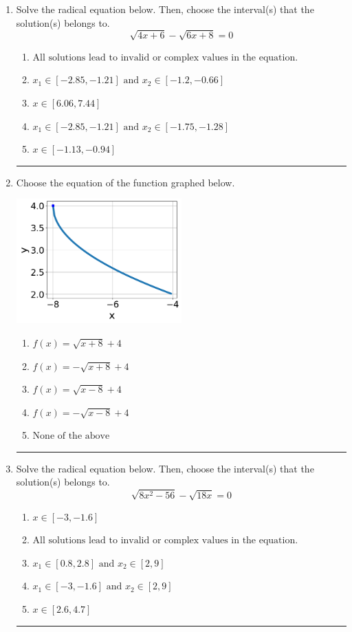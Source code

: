 \documentclass[14pt]{extbook}
\newcommand{\litem}[1]{\item#1\hspace*{-1cm}\rule{\textwidth}{0.4pt}}
\begin{document}
\begin{enumerate}
{\begin{enumerate}[label=\Alph*.]
\end{enumerate} }
\litem{
Solve the radical equation below. Then, choose the interval(s) that the solution(s) belongs to.\[ \sqrt{4 x + 6} - \sqrt{6 x + 8} = 0 \]\begin{enumerate}[label=\Alph*.]
\item \( \text{All solutions lead to invalid or complex values in the equation.} \)
\item \( x_1 \in [-2.85, -1.21] \text{ and } x_2 \in [-1.2,-0.66] \)
\item \( x \in [6.06,7.44] \)
\item \( x_1 \in [-2.85, -1.21] \text{ and } x_2 \in [-1.75,-1.28] \)
\item \( x \in [-1.13,-0.94] \)

\end{enumerate} }
\litem{
Choose the equation of the function graphed below.
\begin{center}
    \includegraphics[width=0.5\textwidth]{../Figures/radicalGraphToEquationCopyC.png}
\end{center}
\begin{enumerate}[label=\Alph*.]
\item \( f(x) = \sqrt{x + 8} + 4 \)
\item \( f(x) = - \sqrt{x + 8} + 4 \)
\item \( f(x) = \sqrt{x - 8} + 4 \)
\item \( f(x) = - \sqrt{x - 8} + 4 \)
\item \( \text{None of the above} \)

\end{enumerate} }
\litem{
Solve the radical equation below. Then, choose the interval(s) that the solution(s) belongs to.\[ \sqrt{8 x^2 - 56} - \sqrt{18 x} = 0 \]\begin{enumerate}[label=\Alph*.]
\item \( x \in [-3,-1.6] \)
\item \( \text{All solutions lead to invalid or complex values in the equation.} \)
\item \( x_1 \in [0.8, 2.8] \text{ and } x_2 \in [2,9] \)
\item \( x_1 \in [-3, -1.6] \text{ and } x_2 \in [2,9] \)
\item \( x \in [2.6,4.7] \)


\end{enumerate}}
\end{enumerate}
\end{document}
